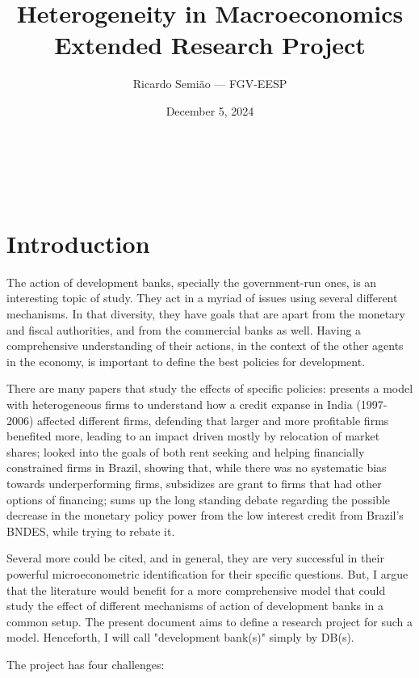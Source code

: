 \documentclass[12pt]{article}
\title{Heterogeneity in Macroeconomics\\
Extended Research Project}
\author{Ricardo Semião --- FGV-EESP}
\date{December 5, 2024}
\makeatletter
\renewcommand{\maketitle}{
  \begin{center}
    {\Huge \@title}\\[2em]
    {\large \@author \hfill \@date}\\[2em]
  \end{center}
}
\makeatother
\begin{document}
\maketitle



\section{Introduction}

The action of development banks, specially the government-run ones, is an interesting topic of study. They act in a myriad of issues using several different mechanisms. In that diversity, they have goals that are apart from the monetary and fiscal authorities, and from the commercial banks as well. Having a comprehensive understanding of their actions, in the context of the other agents in the economy, is important to define the best policies for development.

There are many papers that study the effects of specific policies: \cite{maria_2021} presents a model with heterogeneous firms to understand how a credit expanse in India (1997-2006) affected different firms, defending that larger and more profitable firms benefited more, leading to an impact driven mostly by relocation of market shares; \cite{lazzarini_2015} looked into the goals of both rent seeking and helping financially constrained firms in Brazil, showing that, while there was no systematic bias towards underperforming firms, subsidizes are grant to firms that had other options of financing; \cite{barboza_2023} sums up the long standing debate regarding the possible decrease in the monetary policy power from the low interest credit from Brazil's BNDES, while trying to rebate it.

Several more could be cited, and in general, they are very successful in their powerful microeconometric identification for their specific questions. But, I argue that the literature would benefit for a more comprehensive model that could study the effect of different mechanisms of action of development banks in a common setup. The present document aims to define a research project for such a model. Henceforth, I will call "development bank(s)" simply by DB(s).

The project has four challenges:
\end{document}
